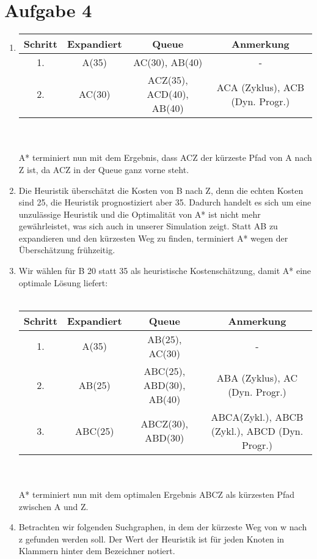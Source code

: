 \documentclass[a4paper,10pt]{article}
\begin{document}
\section*{Aufgabe 4}
\begin{enumerate}[~~a)]
    \item
\begin{tabular}{|c|c|c|c|}
\hline
Schritt & Expandiert & Queue & Anmerkung  \\ \hline
1. & A(35) & AC(30), AB(40) & - \\ \hline
2. & AC(30) & ACZ(35), ACD(40), AB(40) & ACA (Zyklus), ACB (Dyn. Progr.) \\ \hline
\end{tabular}
\\ \\
A* terminiert nun mit dem Ergebnis, dass ACZ der kürzeste Pfad von A nach Z ist, da ACZ in der Queue ganz vorne steht.

\item
	Die Heuristik überschätzt die Kosten von B nach Z, denn die echten Kosten sind 25, die Heuristik prognostiziert aber 35. Dadurch handelt es sich um eine unzulässige Heuristik und die Optimalität von A* ist nicht mehr gewährleistet, was sich auch in unserer Simulation zeigt. Statt AB zu expandieren und den kürzesten Weg zu finden, terminiert A* wegen der Überschätzung frühzeitig.

\item
	Wir wählen für B 20 statt 35 als heuristische Kostenschätzung, damit A* eine optimale Lösung liefert: \\ \\
\begin{tabular}{|c|c|c|c|}
\hline
Schritt & Expandiert & Queue & Anmerkung  \\ \hline
1. & A(35) & AB(25), AC(30) & - \\ \hline
2. & AB(25) & ABC(25), ABD(30), AB(40) & ABA (Zyklus), AC (Dyn. Progr.) \\ \hline
3. & ABC(25) & ABCZ(30), ABD(30) & ABCA(Zykl.), ABCB (Zykl.), ABCD (Dyn. Progr.) \\ \hline
\end{tabular}
\\ \\
A* terminiert nun mit dem optimalen Ergebnis ABCZ als kürzesten Pfad zwischen A und Z.

\item
Betrachten wir folgenden Suchgraphen, in dem der kürzeste Weg von w nach z gefunden werden soll. Der Wert der Heuristik ist für jeden Knoten in Klammern hinter dem Bezeichner notiert.\\


\end{enumerate}
\end{document}
